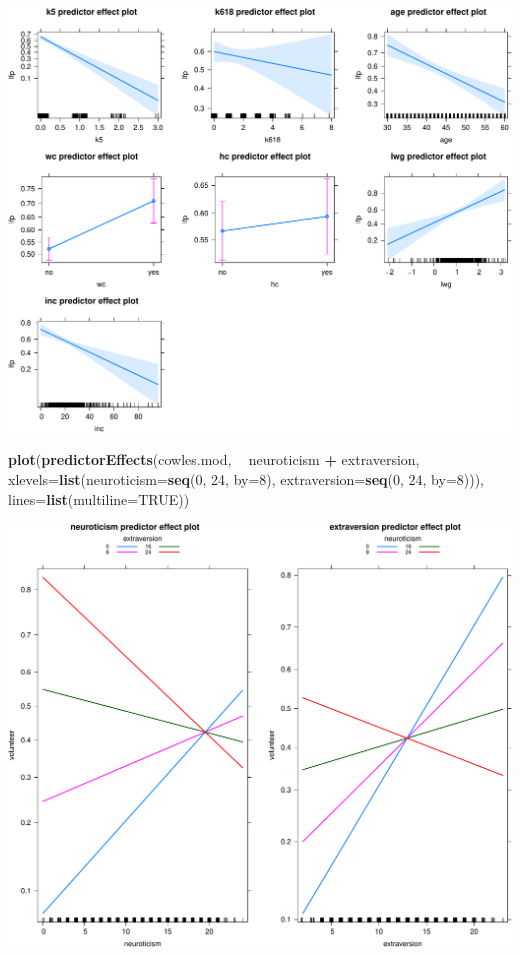 \documentclass[
]{article}
\newenvironment{Shaded}{\begin{snugshade}}{\end{snugshade}}
\newcommand{\DataTypeTok}[1]{\textcolor[rgb]{0.13,0.29,0.53}{#1}}
\newcommand{\DecValTok}[1]{\textcolor[rgb]{0.00,0.00,0.81}{#1}}
\newcommand{\KeywordTok}[1]{\textcolor[rgb]{0.13,0.29,0.53}{\textbf{#1}}}
\newcommand{\NormalTok}[1]{#1}
\newcommand{\OperatorTok}[1]{\textcolor[rgb]{0.81,0.36,0.00}{\textbf{#1}}}
\newcommand{\OtherTok}[1]{\textcolor[rgb]{0.56,0.35,0.01}{#1}}
\newcommand{\StringTok}[1]{\textcolor[rgb]{0.31,0.60,0.02}{#1}}
\begin{document}
\includegraphics{LogisticRegressCh6_files/figure-latex/unnamed-chunk-5-1.pdf}

\begin{Shaded}
\begin{Highlighting}[]
\KeywordTok{plot}\NormalTok{(}\KeywordTok{predictorEffects}\NormalTok{(cowles.mod, }\OperatorTok{~}\StringTok{ }\NormalTok{neuroticism }\OperatorTok{+}\StringTok{ }\NormalTok{extraversion,}
    \DataTypeTok{xlevels=}\KeywordTok{list}\NormalTok{(}\DataTypeTok{neuroticism=}\KeywordTok{seq}\NormalTok{(}\DecValTok{0}\NormalTok{, }\DecValTok{24}\NormalTok{, }\DataTypeTok{by=}\DecValTok{8}\NormalTok{), }
        \DataTypeTok{extraversion=}\KeywordTok{seq}\NormalTok{(}\DecValTok{0}\NormalTok{, }\DecValTok{24}\NormalTok{, }\DataTypeTok{by=}\DecValTok{8}\NormalTok{))), }
    \DataTypeTok{lines=}\KeywordTok{list}\NormalTok{(}\DataTypeTok{multiline=}\OtherTok{TRUE}\NormalTok{))}
\end{Highlighting}
\end{Shaded}

\includegraphics{LogisticRegressCh6_files/figure-latex/unnamed-chunk-5-2.pdf}
\end{document}
